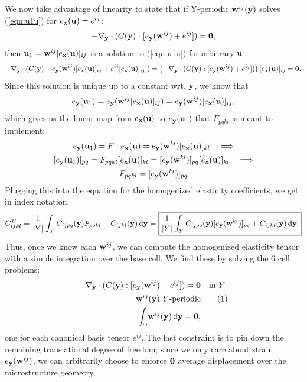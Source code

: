 \documentclass[10pt]{article}
\newcommand\numberthis{\addtocounter{equation}{1}\tag{\theequation}}
\begin{document}
We now take advantage of linearity to state that if Y-periodic ${\bf
w}^{ij}({\bf y})$ solves (\ref{eqn:u1u}) for $e_{\bf x}({\bf u}) = e^{ij}$:
\begin{equation}
-\nabla_{\bf y} \cdot (C({\bf y}) : [e_{\bf y}({\bf w}^{ij}) + e^{ij}]) = {\bf 0},
\end{equation}
then ${\bf u}_1 = {\bf w}^{ij} [e_{\bf x}({\bf u})]_{ij}$ is a solution to
(\ref{eqn:u1u}) for arbitrary ${\bf u}$:
$$
-\nabla_{\bf y} \cdot (C({\bf y}) : [e_{\bf y}({\bf w}^{ij})[e_{\bf x}({\bf u})]_{ij} + e^{ij}[e_{\bf x}({\bf u})]_{ij}]) =
\left(-\nabla_{\bf y} \cdot (C({\bf y}) : [e_{\bf y}({\bf w}^{ij}) + e^{ij}]) \right)[e_{\bf x}({\bf u})]_{ij} = {\bf 0}.
$$
Since this solution is unique up to a constant wrt. ${\bf y}$, we know that
$$
e_{\bf y}({\bf u}_1) = e_{\bf y}({\bf w}^{ij} [e_{\bf x}({\bf u})]_{ij}) = e_{\bf y}({\bf w}^{ij})[e_{\bf x}({\bf u})]_{ij},
$$
which gives us the linear map from $e_{\bf x}({\bf u})$ to $e_{\bf y}({\bf u}_1)$
that $F_{pqkl}$ is meant to implement:
\begin{gather*}
e_{\bf y}({\bf u}_1) = F : e_{\bf x}({\bf u}) = e_{\bf y}({\bf w}^{kl})[e_{\bf x}({\bf u})]_{kl} \quad \Longrightarrow \\
[e_{\bf y}({\bf u}_1)]_{pq} = F_{pqkl} [e_{\bf x}({\bf u})]_{kl} = [e_{\bf y}({\bf w}^{kl})]_{pq}[e_{\bf x}({\bf u})]_{kl} \quad \Longrightarrow \\
F_{pqkl} = [e_{\bf y}({\bf w}^{kl})]_{pq}
\end{gather*}
Plugging this into the equation for the homogenized elasticity coefficients, we get in index notation:
\begin{equation}
    \label{eqn:Eh}
C^H_{ijkl} = \frac{1}{|Y|} \int_Y C_{ijpq}({\bf y}) F_{pqkl} + C_{ijkl}({\bf y}) \, \mathrm{d} {\bf y}
= \boxed{\frac{1}{|Y|} \int_Y C_{ijpq}({\bf y}) [e_{\bf y}({\bf w}^{kl})]_{pq} + C_{ijkl}({\bf y}) \, \mathrm{d} {\bf y}.}
\end{equation}
Thus, once we know each ${\bf w}^{ij}$, we can compute the homogenized elasticity tensor
with a simple integration over the base cell. We find these by solving the 6 cell problems:
\begin{align*}
    -\nabla_{\bf y} \cdot (C({\bf y}) : [e_{\bf y}({\bf w}^{ij}) + e^{ij}]) = {\bf 0} & \quad \text{in } Y \\
    {\bf w}^{ij}({\bf y})\ Y \text{-periodic} &     \numberthis \label{eqn:cell} \\
    \int_\omega \! {\bf w}^{ij}({\bf y})  \, \mathrm{d} {\bf y} =  {\bf 0}, 
\end{align*}
one for each canonical basis tensor $e^{ij}$. The last constraint is to pin
down the remaining translational degree of freedom; since we only care about
strain $e_{\bf y}({\bf w}^{ij})$, we can arbitrarily choose to enforce ${\bf
0}$ average displacement over the microstructure geometry.
\end{document}
